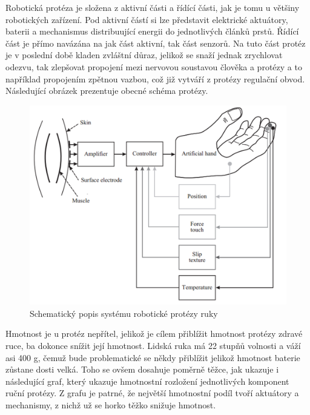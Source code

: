 \documentclass[a4paper,12pt]{article}
\begin{document}
Robotická protéza je složena z aktivní části a řídící části, jak je tomu u většiny robotických zařízení. Pod aktivní částí si lze představit elektrické aktuátory, baterii a mechanismus distribuující energii do jednotlivých článků prstů. Řídící část je přímo navázána na jak část aktivní, tak část senzorů. Na tuto část protéz je v poslední době kladen zvláštní důraz, jelikož se snaží jednak zrychlovat odezvu, tak zlepšovat propojení mezi nervovou soustavou člověka a protézy a to například propojením zpětnou vazbou, což již vytváří z protézy regulační obvod. Následující obrázek prezentuje obecné schéma protézy.\cite{Chappell}


\begin{figure}[b!]
\centering
\includegraphics[scale=0.8]{figures/Rizeni_roboticke_protezy.PNG}
\caption{Schematický popis systému robotické protézy ruky \cite{Chappell}}
\end{figure}\break

Hmotnost je u protéz nepřítel, jelikož je cílem přiblížit hmotnost protézy zdravé ruce, ba dokonce snížit její hmotnost. Lidská ruka má 22 stupňů volnosti a váží asi 400 g, čemuž bude problematické se někdy přiblížit jelikož hmotnost baterie zůstane dosti velká. Toho se ovšem dosahuje poměrně těžce, jak ukazuje i následující graf, který ukazuje hmotnostní rozložení jednotlivých komponent ruční protézy. Z grafu je patrné, že největší hmotnostní podíl tvoří aktuátory a mechanismy, z nichž už se horko těžko snižuje hmotnost.\cite{Chappell}\cite{Jung}
\end{document}
